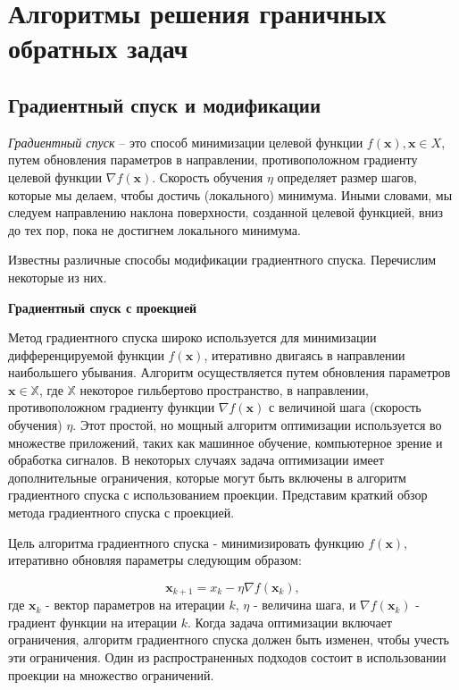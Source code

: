 \section{Алгоритмы решения граничных обратных задач}\label{sec:ch4/sec3}


\subsection{Градиентный спуск и модификации}
\label{subsec:ch4/sec3/grad}
\textit{Градиентный спуск} -- это способ минимизации целевой функции
$f(\mathbf{x}), \mathbf{x} \in X$, путем обновления параметров
в направлении, противоположном градиенту целевой функции
$\nabla f(\mathbf{x})$.
Скорость обучения $\eta$ определяет размер шагов, которые мы делаем,
чтобы достичь (локального) минимума.
Иными словами, мы следуем направлению наклона поверхности,
созданной целевой функцией, вниз до тех пор,
пока не достигнем локального минимума.

Известны различные способы модификации градиентного спуска.
Перечислим некоторые из них.

\textbf{Градиентный спуск с проекцией}

Метод градиентного спуска широко используется для минимизации дифференцируемой
функции $f(\mathbf{x})$, итеративно двигаясь в направлении наибольшего убывания.
Алгоритм осуществляется путем обновления параметров
$\mathbf{x} \in \mathbb{X}$, где $\mathbb{X}$ некоторое гильбертово пространство,
в направлении, противоположном
градиенту функции $\nabla f(\mathbf{x})$ с величиной шага
(скорость обучения) $\eta$.
Этот простой, но мощный алгоритм оптимизации используется во
множестве приложений, таких как машинное обучение, компьютерное
зрение и обработка сигналов.
В некоторых случаях задача оптимизации
имеет дополнительные ограничения, которые могут быть включены в
алгоритм градиентного спуска с использованием проекции.
Представим краткий обзор метода градиентного спуска с проекцией.


Цель алгоритма градиентного спуска - минимизировать функцию
$f(\mathbf{x})$, итеративно обновляя параметры следующим образом:

\[ \mathbf{x}_{k+1} = x_k - \eta \nabla f(\mathbf{x}_k), \]
где $\mathbf{x}_k$ - вектор параметров на итерации $k$,
$\eta$ - величина шага, и $\nabla f(\mathbf{x}_k)$ - градиент
функции на итерации $k$.
Когда задача оптимизации включает ограничения, алгоритм
градиентного спуска должен быть изменен, чтобы учесть эти ограничения.
Один из распространенных подходов состоит в использовании проекции
на множество ограничений.


